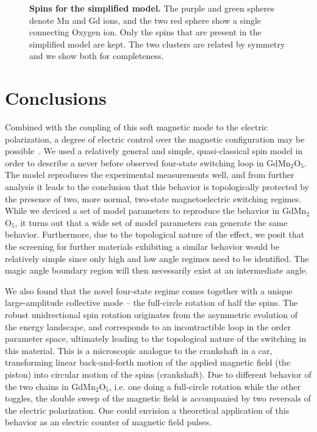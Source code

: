 \begin{figure}[b]
	\caption{\label{fig:GdMn2O5_simple_model}{\bf Spins for the simplified model.} The purple and green spheres denote Mn and Gd ions, and the two red sphere show a single connecting Oxygen ion. Only the spins that are present in the simplified model are kept. The two clusters are related by symmetry and we show both for completeness.}
\end{figure}

\section{Conclusions}
Combined with the coupling of this soft magnetic mode to the electric polarization, a degree of electric control over the magnetic configuration may be possible~\cite{Oh14}.
We used a relatively general and simple, quasi-classical spin model in order to describe a never before observed four-state switching loop in GdMn$_2$O$_5$.
The model reproduces the experimental measurements well, and from further analysis it leads to the conclusion that this behavior is topologically protected by the presence of two, more normal, two-state magnetoelectric switching regimes.
While we deviced a set of model parameters to reproduce the behavior in GdMn$_2$O$_5$, it turns out that a wide set of model parameters can generate the same behavior.
Furthermore, due to the topological nature of the effect, we posit that the screening for further materials exhibiting a similar behavior would be relatively simple since only high and low angle regimes need to be identified.
The magic angle boundary region will then necessarily exist at an intermediate angle.

We also found that the novel four-state regime comes together with a unique large-amplitude collective mode -- the full-circle rotation of half the spins.
The robust unidrectional spin rotation originates from the asymmetric evolution of the energy landscape, and corresponds to an incontractible loop in the order parameter space, ultimately leading to the topological nature of the switching in this material.
This is a microscopic analogue to the crankshaft in a car, transforming linear back-and-forth motion of the applied magnetic field (the piston) into circular motion of the spins (crankshaft).
Due to different behavior of the two chains in GdMn$_2$O$_5$, i.e. one doing a full-circle rotation while the other toggles, the double sweep of the magnetic field is accompanied by two reversals of the electric polarization.
%
One could envision a theoretical application of this behavior as an electric counter of magnetic field pulses.
